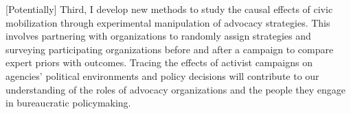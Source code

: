 [Potentially] Third, I develop new methods to study the causal effects of civic mobilization through experimental manipulation of advocacy strategies. This involves partnering with organizations to randomly assign strategies and surveying participating organizations before and after a campaign to compare expert priors with outcomes. 
Tracing the effects of activist campaigns on agencies' political environments and policy decisions will contribute to our understanding of the roles of advocacy organizations and the people they engage in bureaucratic policymaking. 